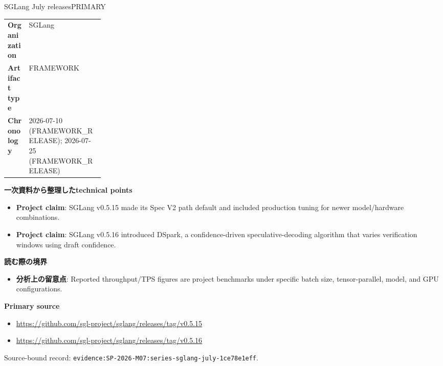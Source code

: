 \begin{technicalnote}{SGLang July releases}{PRIMARY}
\begin{tabularx}{\linewidth}{@{}>{\bfseries}p{0.22\linewidth}X@{}}
Organization & SGLang \\
Artifact type & FRAMEWORK \\
Chronology & 2026-07-10 (FRAMEWORK\_RELEASE); 2026-07-25 (FRAMEWORK\_RELEASE) \\
\end{tabularx}
\smallskip
{\bfseries 一次資料から整理したtechnical points}
\begin{itemize}[leftmargin=1.5em,itemsep=0.35em]
\item \textbf{Project claim}: SGLang v0.5.15 made its Spec V2 path default and included production tuning for newer model/hardware combinations.
\item \textbf{Project claim}: SGLang v0.5.16 introduced DSpark, a confidence-driven speculative-decoding algorithm that varies verification windows using draft confidence.
\end{itemize}
{\bfseries 読む際の境界}
\begin{itemize}[leftmargin=1.5em,itemsep=0.35em]
\item \textbf{分析上の留意点}: Reported throughput/TPS figures are project benchmarks under specific batch size, tensor-parallel, model, and GPU configurations.
\end{itemize}
{\bfseries Primary source}
\begingroup\sloppy
\begin{itemize}[leftmargin=1.5em,itemsep=0.25em]
\item {\scriptsize\url{https://github.com/sgl-project/sglang/releases/tag/v0.5.15}}
\item {\scriptsize\url{https://github.com/sgl-project/sglang/releases/tag/v0.5.16}}
\end{itemize}
\endgroup
{\scriptsize\color{SurveyMuted}Source-bound record: \texttt{evidence:SP-2026-M07:series-sglang-july-1ce78e1eff}.}
\end{technicalnote}
\medskip

